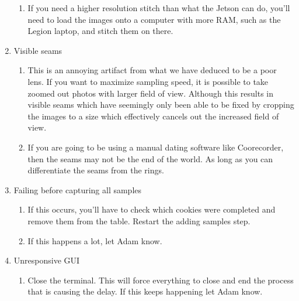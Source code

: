 \documentclass{article}
\begin{document}
\begin{outline}[enumerate]
\begin{enumerate}
\begin{enumerate}
        \item If you need a higher resolution stitch than what the Jetson can do, you'll need to load the images onto a computer with more RAM, such as the Legion laptop, and stitch them on there. 
        \end{enumerate}
    \item Visible seams
        \begin{enumerate}
        \item This is an annoying artifact from what we have deduced to be a poor lens. If you want to maximize sampling speed, it is possible to take zoomed out photos with larger field of view. Although this 
        results in visible seams which have seemingly only been able to be fixed by cropping the images to a size which effectively cancels out the increased field of view.
        \item If you are going to be using a manual dating software like Coorecorder, then the seams may not be the end of the world. As long as you can differentiate the seams from the rings.
        \end{enumerate}
    \item Failing before capturing all samples
        \begin{enumerate}
            \item If this occurs, you'll have to check which cookies were completed and remove them from the table. Restart the adding samples step. 
            \item If this happens a lot, let Adam know.
        \end{enumerate}
    \item Unresponsive GUI
        \begin{enumerate}
            \item Close the terminal. This will force everything to close and end the process that is causing the delay. If this keeps happening let Adam know.
        \end{enumerate}


\end{enumerate}
\end{outline}
\end{document}
